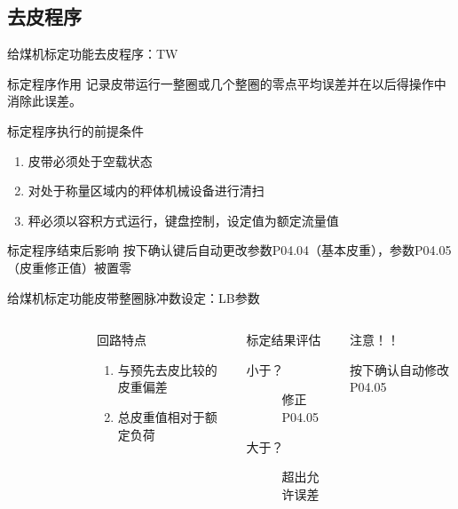 \documentclass[12pt,hyperref={CJKbookmarks=true}]{beamer} %
\begin{document}
\subsection{去皮程序}
\begin{frame}{给煤机标定功能}{去皮程序：TW}
  		\begin{block}{标定程序作用}
  		记录皮带运行一整圈或几个整圈的零点平均误差并在以后得操作中消除此误差。
\end{block}
\begin{exampleblock}{标定程序执行的前提条件}
  		\begin{enumerate}
				\item 皮带必须处于空载状态
				\item  对处于称量区域内的秤体机械设备进行清扫
				\item   秤必须以容积方式运行，键盘控制，设定值为额定流量值			
			\end{enumerate}
\end{exampleblock}
\begin{alertblock}{标定程序结束后影响}
  		按下确认键后自动更改参数P04.04（基本皮重），参数P04.05（皮重修正值）被置零
\end{alertblock}
	\end{frame}
\begin{frame}{给煤机标定功能}{皮带整圈脉冲数设定：LB参数}
  		\begin{columns}
\begin{figure}
	
\end{figure}
\begin{block}{回路特点}
			\begin{enumerate}
				\item  与预先去皮比较的皮重偏差
				\item  总皮重值相对于额定负荷
				\end{enumerate}
\end{block}
\begin{exampleblock}{标定结果评估}
			\begin{description}
				\item[小于？]修正P04.05
				\item[大于？]超出允许误差
				\end{description}
\end{exampleblock}
\begin{alertblock}{注意！！}
			
				按下确认自动修改P04.05
\end{alertblock}
		\end{columns}
	\end{frame}
\end{document}
